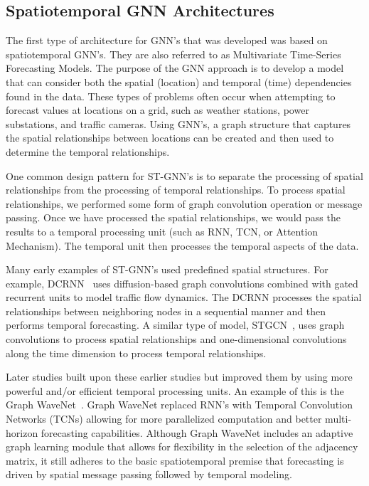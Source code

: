 \subsection{Spatiotemporal GNN Architectures} \label{sec:stgnn}

The first type of architecture for GNN’s that was developed was based on spatiotemporal GNN's. They are also referred to as Multivariate Time-Series Forecasting Models. The purpose of the GNN approach is to develop a model that can consider both the spatial (location) and temporal (time) dependencies found in the data. These types of problems often occur when attempting to forecast values at locations on a grid, such as weather stations, power substations, and traffic cameras. Using GNN's, a graph structure that captures the spatial relationships between locations can be created and then used to determine the temporal relationships.

One common design pattern for ST-GNN's is to separate the processing of spatial relationships from the processing of temporal relationships. To process spatial relationships, we performed some form of graph convolution operation or message passing. Once we have processed the spatial relationships, we would pass the results to a temporal processing unit (such as RNN, TCN, or Attention Mechanism). The temporal unit then processes the temporal aspects of the data.

Many early examples of ST-GNN's used predefined spatial structures. For example, DCRNN~\parencite{li2018dcrnn} uses diffusion-based graph convolutions combined with gated recurrent units to model traffic flow dynamics. The DCRNN processes the spatial relationships between neighboring nodes in a sequential manner and then performs temporal forecasting. A similar type of model, STGCN~\parencite{yu2018stgcn}, uses graph convolutions to process spatial relationships and one-dimensional convolutions along the time dimension to process temporal relationships.

Later studies built upon these earlier studies but improved them by using more powerful and/or efficient temporal processing units. An example of this is the Graph WaveNet~\parencite{wu2019graphwavenetdeepspatialtemporal}. Graph WaveNet replaced RNN’s with Temporal Convolution Networks (TCNs) allowing for more parallelized computation and better multi-horizon forecasting capabilities. Although Graph WaveNet includes an adaptive graph learning module that allows for flexibility in the selection of the adjacency matrix, it still adheres to the basic spatiotemporal premise that forecasting is driven by spatial message passing followed by temporal modeling.

